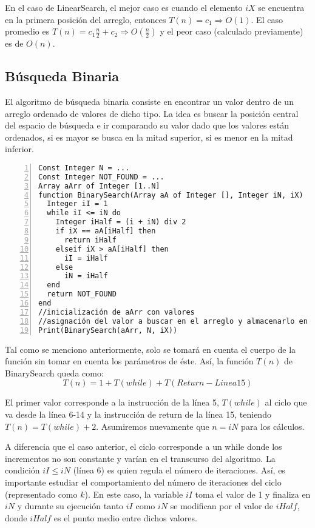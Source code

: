 En el caso de LinearSearch, el mejor caso es cuando el elemento $iX$ se encuentra en la primera posición del arreglo, entonces $T(n) = c_1 \Rightarrow O(1)$. El caso promedio es $T(n) = c_1\frac{n}{2} + c_2 \Rightarrow O(\frac{n}{2})$ y el peor caso (calculado previamente) es de $O(n)$.

\subsection{Búsqueda Binaria}

El algoritmo de búsqueda binaria consiste en encontrar un valor dentro de un arreglo ordenado de valores de dicho tipo. La idea es buscar la posición central del espacio de búsqueda e ir comparando su valor dado que los valores están ordenados, si es mayor se busca en la mitad superior, si es menor en la mitad inferior.

\begin{lstlisting}[upquote=true, language=pseudo, numbers=left]
Const Integer N = ...
Const Integer NOT_FOUND = ...
Array aArr of Integer [1..N]
function BinarySearch(Array aA of Integer [], Integer iN, iX)	//iX es el elemento a buscar
  Integer iI = 1
  while iI <= iN do
    Integer iHalf = (i + iN) div 2
    if iX == aA[iHalf] then
      return iHalf
    elseif iX > aA[iHalf] then
      iI = iHalf
    else
      iN = iHalf
  end
  return NOT_FOUND
end
//inicialización de aArr con valores
//asignación del valor a buscar en el arreglo y almacenarlo en iX
Print(BinarySearch(aArr, N, iX))
\end{lstlisting}

Tal como se menciono anteriormente, solo se tomará en cuenta el cuerpo de la función sin tomar en cuenta los parámetros de éste. Así, la función $T(n)$ de BinarySearch queda como:
$$T(n) = 1 + T(while) + T(Return - Linea15)$$

El primer valor corresponde a la instrucción de la línea 5, $T(while)$ al ciclo que va desde la línea 6-14 y la instrucción de return de la línea 15, teniendo $T(n) = T(while) + 2$. Asumiremos nuevamente que $n = iN$ para los cálculos.

A diferencia que el caso anterior, el ciclo corresponde a un while donde los incrementos no son constante y varían en el transcurso del algoritmo. La condición $iI \le iN$ (línea 6) es quien regula el número de iteraciones. Así, es importante estudiar el comportamiento del número de iteraciones del ciclo (representado como $k$). En este caso, la variable $iI$ toma el valor de 1 y finaliza en $iN$ y durante su ejecución tanto $iI$ como $iN$ se modifican por el valor de $iHalf$, donde $iHalf$ es el punto medio entre dichos valores.

